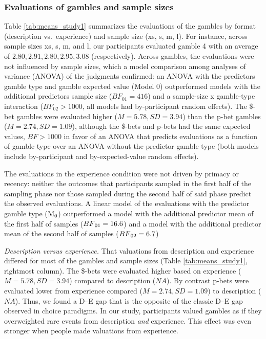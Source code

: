 \documentclass[a4paper, man, floatsintext]{apa6}
\title{}
\author{Jana B. Jarecki}
\date{21 November, 2019}
\begin{document}
\subsubsection{Evaluations of gambles and sample sizes}

Table \ref{tab:means_study1} summarizes the evaluations of the gambles
by format (description vs.~experience) and sample size (xs, s, m, l).
For instance, across sample sizes xs, s, m, and l, our participants
evaluated gamble 4 with an average of \(2.80, 2.91, 2.80, 2.95, 3.08\)
(respectively). Across gambles, the evaluations were not influenced by
sample sizes, which a model comparison among analyses of variance
(ANOVA) of the judgments confirmed: an ANOVA with the predictors gamble
type and gamble expected value (Model 0) outperformed models with the
additional predictors sample size (\(BF_{01}= 416\)) and a sample-size x
gamble-type interaction (\(BF_{02} > 1000\), all models had
by-participant random effects). The \$-bet gambles were evaluated higher
(\(M=5.78, SD=3.94\)) than the p-bet gambles (\(M=2.74, SD=1.09\)),
although the \$-bets and p-bets had the same expected values,
\(BF > 1000\) in favor of an ANOVA that predicts evaluations as a
function of gamble type over an ANOVA without the predictor gamble type
(both models include by-participant and by-expected-value random
effects).

The evaluations in the experience condition were not driven by primacy
or recency: neither the outcomes that participants sampled in the first
half of the sampling phase nor those sampled during the second half of
said phase predict the observed evaluations. A linear model of the
evaluations with the predictor gamble type
(\(\mathrm{M}\textsubscript{0}\)) outperformed a model with the
additional predictor mean of the first half of samples
(\(BF\textsubscript{01} = 16.6\)) and a model with the additional
predictor mean of the second half of samples
(\(BF\textsubscript{02} = 6.7\))

\textit{Description versus experience.} That valuations from description
and experience differed for most of the gambles and sample sizes (Table
\ref{tab:means_study1}, rightmost column). The \$-bets were evaluated
higher based on experience (\(M=5.78, SD=3.94\)) compared to description
(\(NA\)). By contrast p-bets were evaluated lower from experience
compared (\(M=2.74, SD=1.09\)) to description (\(NA\)). Thus, we found a
D--E gap that is the opposite of the classic D--E gap observed in choice
paradigms. In our study, participants valued gambles as if they
overweighted rare events from description \textit{and} experience. This
effect was even stronger when people made valuations from experience.
\end{document}
